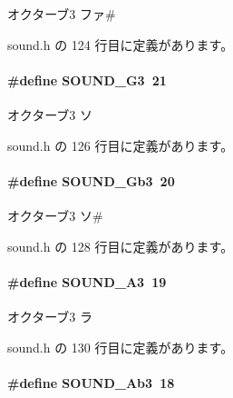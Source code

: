 オクターブ3 ファ\# 



 sound.\+h の 124 行目に定義があります。

\paragraph[{S\+O\+U\+N\+D\+\_\+\+G3}]{\setlength{\rightskip}{0pt plus 5cm}\#define S\+O\+U\+N\+D\+\_\+\+G3~21}\label{sound_8h_a3dc460e8030ea66b5b0af7074f32b3ac_a3dc460e8030ea66b5b0af7074f32b3ac}


オクターブ3 ソ 



 sound.\+h の 126 行目に定義があります。

\paragraph[{S\+O\+U\+N\+D\+\_\+\+Gb3}]{\setlength{\rightskip}{0pt plus 5cm}\#define S\+O\+U\+N\+D\+\_\+\+Gb3~20}\label{sound_8h_a154622a25029a712f113945150b1325b_a154622a25029a712f113945150b1325b}


オクターブ3 ソ\# 



 sound.\+h の 128 行目に定義があります。

\paragraph[{S\+O\+U\+N\+D\+\_\+\+A3}]{\setlength{\rightskip}{0pt plus 5cm}\#define S\+O\+U\+N\+D\+\_\+\+A3~19}\label{sound_8h_a9f45e8626868aaf3fe91e01a56686ecd_a9f45e8626868aaf3fe91e01a56686ecd}


オクターブ3 ラ 



 sound.\+h の 130 行目に定義があります。

\paragraph[{S\+O\+U\+N\+D\+\_\+\+Ab3}]{\setlength{\rightskip}{0pt plus 5cm}\#define S\+O\+U\+N\+D\+\_\+\+Ab3~18}\label{sound_8h_a41403a0a136d706e529e4017966e1a10_a41403a0a136d706e529e4017966e1a10}


